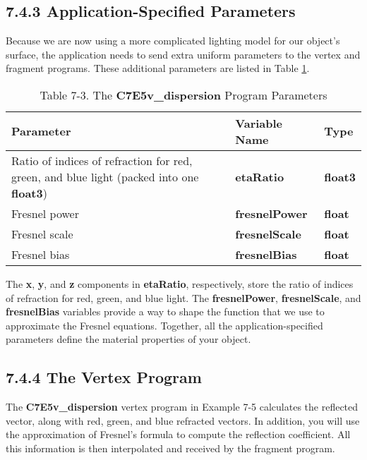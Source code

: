 \documentclass[../main.tex]{subfiles}
\begin{document}
\subsection{7.4.3 Application-Specified Parameters}

Because we are now using a more complicated lighting model for our object's surface, the application needs to send extra uniform parameters to the vertex and fragment programs. These additional parameters are listed in Table \ref{table:7-3}.

\begin{table}
\centering
\begin{tabular}{ p{5cm} p{4cm} p{2cm}  } 

Parameter & Variable Name & Type \\
\hline

Ratio of indices of refraction for red, green, and blue light (packed into one \textbf{float3}) & \textbf{etaRatio} & \textbf{float3} \\
Fresnel power & \textbf{fresnelPower} & \textbf{float} \\
Fresnel scale & \textbf{fresnelScale} & \textbf{float} \\
Fresnel bias & \textbf{fresnelBias} & \textbf{float} \\

\hline

\end{tabular}

\caption{Table 7-3. The \textbf{C7E5v_dispersion} Program Parameters}
\label{table:7-3}

\end{table}

The \textbf{x}, \textbf{y}, and \textbf{z} components in \textbf{etaRatio}, respectively, store the ratio of indices of refraction for red, green, and blue light. The \textbf{fresnelPower}, \textbf{fresnelScale}, and \textbf{fresnelBias} variables provide a way to shape the function that we use to approximate the Fresnel equations. Together, all the application-specified parameters define the material properties of your object.

\subsection{7.4.4 The Vertex Program}

The \textbf{C7E5v_dispersion} vertex program in Example 7-5 calculates the reflected vector, along with red, green, and blue refracted vectors. In addition, you will use the approximation of Fresnel's formula to compute the reflection coefficient. All this information is then interpolated and received by the fragment program.
\end{document}
